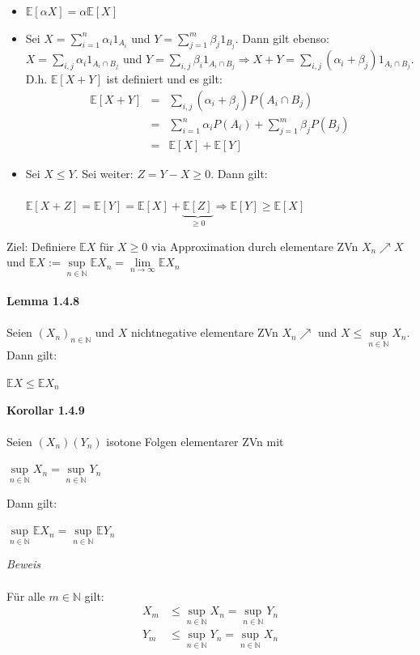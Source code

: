 \documentclass[10pt,a4paper]{report}
\numberwithin{equation}{section}
\numberwithin{figure}{section}
\theoremstyle{plain}
\theoremstyle{definition}
\theoremstyle{plain}
\theoremstyle{definition}
\theoremstyle{remark}
\theoremstyle{plain}
\theoremstyle{plain}
\theoremstyle{plain}
\newcommand{\1}{ \mathbb{1} } %
\begin{document}
\begin{itemize}
\item $\mathbb{E}[\alpha X]=\alpha \mathbb{E}[X]$
\item Sei $X=\sum\limits_{i=1}^n\alpha_i 1_{A_i}$ und $Y=\sum\limits_{j=1}^m\beta_j1_{B_j}$. Dann gilt ebenso: $X=\sum\limits_{i,j}\alpha_i1_{A_i\cap B_j}$ und $Y=\sum\limits_{i,j}\beta_i1_{A_i\cap B_j} \Rightarrow X+Y=\sum\limits_{i,j}(\alpha_i+\beta_j)1_{A_i\cap B_j}$. D.h. $\mathbb{E}[X+Y]$ ist definiert und es gilt:
\begin{eqnarray*}
\mathbb{E}[X+Y]&=& \sum\limits_{i,j}(\alpha_i+\beta_j)P(A_i\cap B_j)\\
&=&\sum\limits_{i=1}^n\alpha_i P(A_i)+\sum\limits_{j=1}^m\beta_jP(B_j)\\
&=&\mathbb{E}[X]+\mathbb{E}[Y]
\end{eqnarray*} 
\item Sei $X\leq Y$. Sei weiter: $Z=Y-X\geq 0$. Dann gilt:\\\\
$\mathbb{E}[X+Z]=\mathbb{E}[Y]=\mathbb{E}[X]+\underbrace{\mathbb{E}[Z]}_{\geq 0} \Rightarrow \mathbb{E}[Y]\geq \mathbb{E}[X]$
\end{itemize}
Ziel: Definiere $\mathbb{E}X$ für $X\geq 0$ via Approximation durch elementare ZVn $X_n\nearrow X$ und $\mathbb{E}X:=\sup\limits_{n\in \mathbb{N}}\mathbb{E}X_n=\lim\limits_{n\to \infty} \mathbb{E}X_n$\\\\
\textbf{Lemma 1.4.8}\\\\
Seien $(X_n)_{n\in \mathbb{N}}$ und $X$ nichtnegative elementare ZVn $X_n\nearrow$ und $X\leq \sup\limits_{n\in \mathbb{N}} X_n$. Dann gilt:
\begin{center}
$\mathbb{E}X\leq \mathbb{E}X_n$ 
\end{center} 
\textbf{Korollar 1.4.9}\\\\
Seien $(X_n)(Y_n)$ isotone Folgen elementarer ZVn mit 
\begin{center}
$\sup\limits_{n\in \mathbb{N}} X_n=\sup\limits_{n\in \mathbb{N}} Y_n$
\end{center}
Dann gilt:
\begin{center}
$\sup\limits_{n\in \mathbb{N}}\mathbb{E} X_n=\sup\limits_{n\in \mathbb{N}}\mathbb{E} Y_n$
\end{center}
\textit{Beweis}\\\\
Für alle $m\in \mathbb{N}$ gilt:
\begin{eqnarray*}
X_m&\leq\sup\limits_{n\in \mathbb{N}} X_n=\sup\limits_{n\in \mathbb{N}} Y_n\\
Y_m&\leq\sup\limits_{n\in \mathbb{N}} Y_n=\sup\limits_{n\in \mathbb{N}} X_n
\end{eqnarray*}
\end{document}
